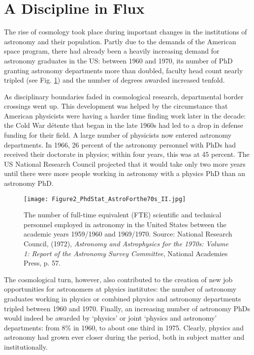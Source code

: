 \documentclass{naturefig}
\begin{document}
\section*{A Discipline in Flux}

The rise of cosmology took place during important changes in the institutions of astronomy and their population. Partly due to the demands of the American space program, there had already been a heavily increasing demand for astronomy graduates in the US:\cite{NationalResearchCouncil1964} between 1960 and 1970, its number of PhD granting astronomy departments more than doubled, faculty head count nearly tripled (see Fig. \ref{fig:PhD2}) and the number of degrees awarded increased tenfold.\cite{NationalResearchCouncil1973}


As disciplinary boundaries faded in cosmological research, departmental border crossings went up. This development was helped by the circumstance that American physicists were having a harder time finding work later in the decade: the Cold War d{\'e}tente that began in the late 1960s had led to a drop in defense funding for their field.\cite{Kaiser2002,Kaiser2006}  A large number of physicists now entered astronomy departments.  In 1966, 26 percent of the astronomy personnel with PhDs had received their doctorate in physics; within four years, this was at 45 percent.\cite{NationalResearchCouncil1973} The US National Research Council projected that it would take only two more years until there were more people working in astronomy with a physics PhD than an astronomy PhD.\cite{NationalResearchCouncil1972,NationalResearchCouncil1973}

\begin{figure}[t]
\centering
\texttt{[image: Figure2\_PhdStat\_AstroForthe70s\_II.jpg]}
\caption[Personnel in Astronomy, 1960-1970]{\label{fig:PhD2}The number of full-time equivalent (FTE) scientific and technical personnel employed in astronomy in the United States between the academic years 1959/1960 and 1969/1970. Source: National Research Council, (1972), \textit{Astronomy and Astrophysics for the 1970s: Volume 1: Report of the Astronomy Survey Committee}, National Academies Press, p. 57.}
    \end{figure}

The cosmological turn, however, also contributed to the creation of new job opportunities for astronomers at physics institutes: the number of astronomy graduates working in physics or combined physics and astronomy departments tripled between 1960 and 1970.\cite{NationalResearchCouncil1983} Finally, an increasing number of astronomy PhDs would indeed be awarded by `physics' or  joint `physics and astronomy' departments: from 8\% in 1960, to about one third in 1975.\cite{NationalResearchCouncil1983} %
Clearly, physics and astronomy had grown ever closer during the period, both in subject matter and institutionally.
\end{document}
